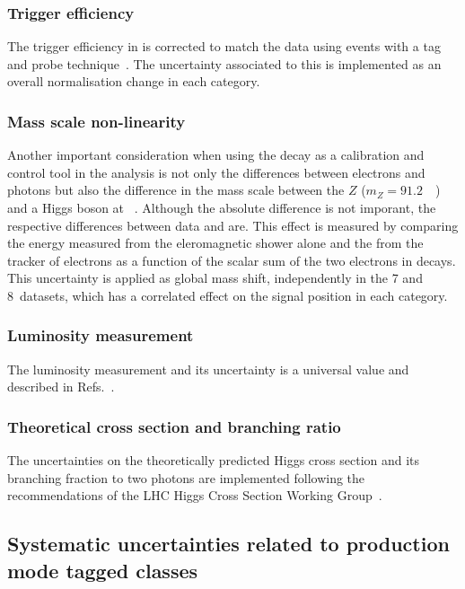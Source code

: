 \subsubsection{Trigger efficiency}

The trigger efficiency in \MC is corrected to match the data using \Zee events with a tag and probe technique~\cite{tag_and_probe}. The uncertainty associated to this is implemented as an overall normalisation change in each category.

\subsubsection{Mass scale non-linearity}

Another important consideration when using the \Zee decay as a calibration and control tool in the analysis is not only the differences between electrons and photons but also the difference in the mass scale between the $Z$ ($m_{Z}=91.2$~\GeV~\cite{pdf}) and a Higgs boson at ~\GeV. Although the absolute difference is not imporant, the respective differences between data and \MC are. This effect is measured by comparing the energy measured from the eleromagnetic shower alone and the \pT from the tracker of electrons as a function of the scalar \ET sum of the two electrons in \Zee decays. This uncertainty is applied as global mass shift, independently in the 7 and 8~\TeV datasets, which has a correlated effect on the signal position in each category.

\subsubsection{Luminosity measurement}

The luminosity measurement and its uncertainty is a \CMS universal value and described in Refs.~\cite{lumi1,lumi2}.

\subsubsection{Theoretical cross section and branching ratio}

The uncertainties on the theoretically predicted \SM Higgs cross section and its branching fraction to two photons are implemented following the recommendations of the LHC Higgs Cross Section Working Group~\cite{LHCHiggsCrossSectionWorkingGroup3}. 

\subsection{Systematic uncertainties related to production mode tagged classes}

